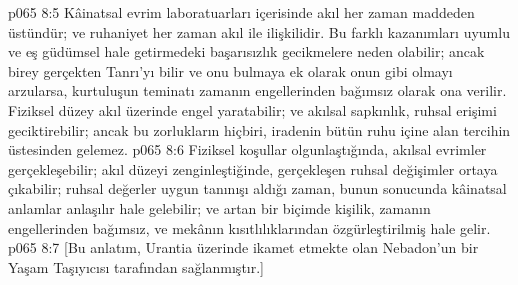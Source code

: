 \vs p065 8:5 Kâinatsal evrim laboratuarları içerisinde akıl her zaman maddeden üstündür; ve ruhaniyet her zaman akıl ile ilişkilidir. Bu farklı kazanımları uyumlu ve eş güdümsel hale getirmedeki başarısızlık gecikmelere neden olabilir; ancak birey gerçekten Tanrı’yı bilir ve onu bulmaya ek olarak onun gibi olmayı arzularsa, kurtuluşun teminatı zamanın engellerinden bağımsız olarak ona verilir. Fiziksel düzey akıl üzerinde engel yaratabilir; ve akılsal sapkınlık, ruhsal erişimi geciktirebilir; ancak bu zorlukların hiçbiri, iradenin bütün ruhu içine alan tercihin üstesinden gelemez.
\vs p065 8:6 Fiziksel koşullar olgunlaştığında, akılsal evrimler  gerçekleşebilir; akıl düzeyi zenginleştiğinde,  gerçekleşen ruhsal değişimler ortaya çıkabilir; ruhsal değerler uygun tanınışı aldığı zaman, bunun sonucunda kâinatsal anlamlar anlaşılır hale gelebilir; ve artan bir biçimde kişilik, zamanın engellerinden bağımsız, ve mekânın kısıtlılıklarından özgürleştirilmiş hale gelir.
\vs p065 8:7 [Bu anlatım, Urantia üzerinde ikamet etmekte olan Nebadon’un bir Yaşam Taşıyıcısı tarafından sağlanmıştır.]
